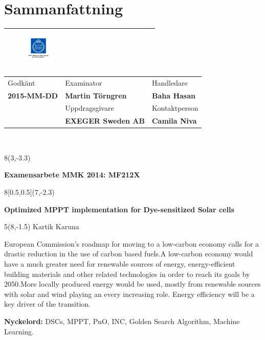 \chapter*{Sammanfattning}
\thispagestyle{begin}

\begin{tabular}{ | p{\dimexpr \linewidth-2\tabcolsep} |} \hline
 \begin{figure}[H]
        
        \includegraphics[width=0.2\textwidth]{images/indust} 
             \end{figure}  \\\hline
\end{tabular}   
\begin{tabular}{ | p{} |
                  p{} |
                  p{} |} \hline
                 Godkänt & Examinator & Handledare \\
                  \textbf{2015-MM-DD}  & \textbf{Martin Törngren} & \textbf{Baha Hasan} \\\hline
                   & Uppdragsgivare & Kontaktperson \\
                   & \textbf{EXEGER Sweden AB} & \textbf{Camila Niva}\\ \hline
\end{tabular} \\
\begin{textblock}{8}(3,-3.3)
\begin{center}
\textbf{Examensarbete MMK 2014: MF212X }
\end{center}
\end{textblock}
\begin{textblock}{8}[0.5,0.5](7,-2.3)
\begin{center}
\textbf{Optimized MPPT implementation for Dye-sensitized Solar cells}
\end{center}
\end{textblock}
\begin{textblock}{5}(8,-1.5)
Kartik Karuna
\end{textblock}

 European Commission's roadmap for moving to a low-carbon economy calls for a drastic reduction in the use of carbon based fuels.A low-carbon economy would have a much greater need for renewable sources of energy, energy-efficient building materials and other related technologies in order to reach its goals by 2050.More locally produced energy would be used, mostly from renewable sources with solar and wind playing an every increasing role.
 Energy efficiency will be a key driver of the transition.



{\bf Nyckelord:} DSCs, MPPT, PnO, INC, Golden Search Algorithm, Machine Learning. 
\acresetall

